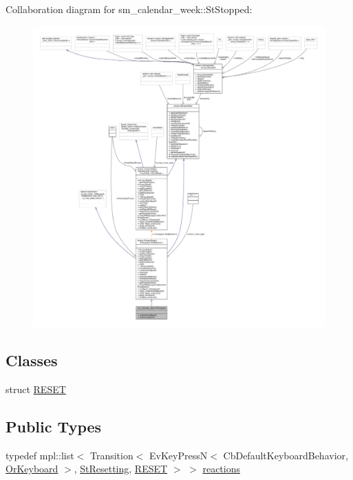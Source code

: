 Collaboration diagram for sm\+\_\+calendar\+\_\+week\+:\+:St\+Stopped\+:
\nopagebreak
\begin{figure}[H]
\begin{center}
\leavevmode
\includegraphics[width=350pt]{structsm__calendar__week_1_1StStopped__coll__graph}
\end{center}
\end{figure}
\subsection*{Classes}
\begin{DoxyCompactItemize}
\item 
struct \hyperlink{structsm__calendar__week_1_1StStopped_1_1RESET}{R\+E\+S\+ET}
\end{DoxyCompactItemize}
\subsection*{Public Types}
\begin{DoxyCompactItemize}
\item 
typedef mpl\+::list$<$ Transition$<$ Ev\+Key\+PressN$<$ Cb\+Default\+Keyboard\+Behavior, \hyperlink{classsm__calendar__week_1_1OrKeyboard}{Or\+Keyboard} $>$, \hyperlink{structsm__calendar__week_1_1StResetting}{St\+Resetting}, \hyperlink{structsm__calendar__week_1_1StStopped_1_1RESET}{R\+E\+S\+ET} $>$ $>$ \hyperlink{structsm__calendar__week_1_1StStopped_a7842bf2ad54538d22b6345d2203e69b1}{reactions}
\end{DoxyCompactItemize}
